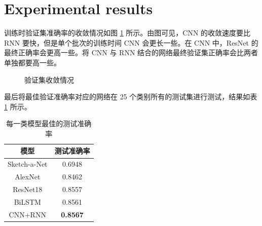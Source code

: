 \section{Experimental results}


训练时验证集准确率的收敛情况如图 \ref{fig:val} 所示。由图可见，CNN 的收敛速度要比 RNN 要快，但是单个批次的训练时间 CNN 会更长一些。在 CNN 中，ResNet 的最终正确率会更高一些。将 CNN 与 RNN 结合的网络最终验证集正确率会比两者单独都要高一些。

\begin{figure}[ht]
    \centering
    \caption{验证集收敛情况}
    \label{fig:val}
\end{figure}

最后将最佳验证准确率对应的网络在 25 个类别所有的测试集进行测试，结果如表 \ref{tab1} 所示。


\begin{table}[H]
\begin{minipage}{0.4\textwidth}
\caption{每一类模型最佳的测试准确率}\label{tab1}
\centering
\begin{tabular}{cc}
\toprule
模型 & 测试准确率 \\
\midrule
Sketch-a-Net & 0.6948\\
AlexNet & 0.8462\\
ResNet18 & 0.8557\\
BiLSTM & 0.8561\\
CNN+RNN & \textbf{0.8567}\\
\bottomrule
\end{tabular}
\end{minipage}
\begin{minipage}{0.55\textwidth}
\centering

\end{minipage}
\end{table}

